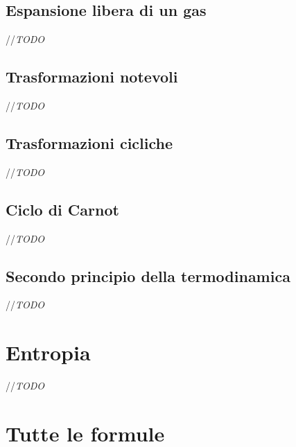 \documentclass{article}
\begin{document}
\subsection{Espansione libera di un gas}
//\textit{TODO}
\subsection{Trasformazioni notevoli}
//\textit{TODO}
\subsection{Trasformazioni cicliche}
//\textit{TODO}
\subsection{Ciclo di Carnot}
//\textit{TODO}
\subsection{Secondo principio della termodinamica}
//\textit{TODO}
\newpage
\section{Entropia}
//\textit{TODO}
\newpage
\section{Tutte le formule}
\end{document}

